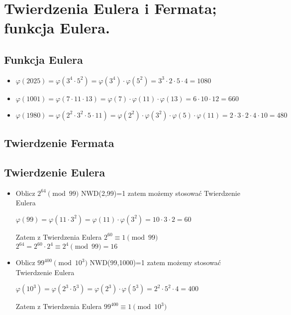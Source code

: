 \documentclass[main.tex]{subfiles}
\begin{document}
    \section{Twierdzenia Eulera i Fermata; funkcja Eulera.}
    \subsection{Funkcja Eulera}

    \begin{itemize}
        \item $\varphi(2025) = \varphi(3^4 \cdot 5^2) = \varphi(3^4) \cdot \varphi(5^2) = 3^3 \cdot 2 \cdot 5 \cdot 4 = 1080$
        \item $\varphi(1001) = \varphi(7\cdot11\cdot13) = \varphi(7) \cdot \varphi(11) \cdot \varphi(13) = 6 \cdot 10 \cdot12 = 660$
        \item $\varphi(1980) = \varphi(2^2 \cdot 3^2 \cdot 5 \cdot 11) = \varphi(2^2) \cdot \varphi(3^2) \cdot \varphi (5) \cdot \varphi(11) = 2 \cdot 3 \cdot 2 \cdot 4 \cdot 10 = 480$
    \end{itemize}

    \subsection{Twierdzenie Fermata}

    \subsection{Twierdzenie Eulera}
    \begin{itemize}
        \item Oblicz $2^{64} \pmod {99}$\newline
        NWD(2,99)=1 zatem możemy stosować Twierdzenie Eulera

        $\varphi(99) = \varphi(11\cdot 3^2) = \varphi(11) \cdot \varphi(3^2) = 10 \cdot 3 \cdot 2 = 60$

        Zatem z Twierdzenia Eulera\newline
        $2^{60} \equiv 1 \pmod {99}$\newline
        $2^{64} = 2^{60} \cdot 2^4 \equiv 2^4 \pmod {99} = 16$

        \item Oblicz $99^{400}\pmod {10^3}$\newline
        NWD(99,1000)=1 zatem możemy stosować Twierdzenie Eulera

        $\varphi(10^3) = \varphi(2^3 \cdot 5^3) = \varphi(2^3) \cdot \varphi(5^3) = 2^2 \cdot 5^2 \cdot 4 = 400$

        Zatem z Twierdzenia Eulera\newline
        $99^{400} \equiv 1 \pmod {10^3}$

    \end{itemize}
    \newpage
\end{document}
